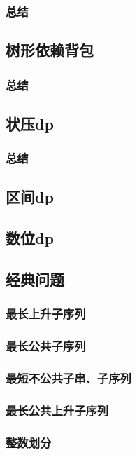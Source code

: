 \documentclass[10pt,a4paper]{article}
\begin{document}
	\subsubsection{总结}
	
	\subsection{树形依赖背包}
	\subsubsection{总结}
	
	\subsection{状压dp}
	\subsubsection{总结}
	
	\subsection{区间dp}
	\subsection{数位dp}
	\subsection{经典问题}
	\subsubsection{最长上升子序列}
	
	\subsubsection{最长公共子序列}
	
	\subsubsection{最短不公共子串、子序列}
	
	\subsubsection{最长公共上升子序列}
	
	\subsubsection{整数划分}
	
\end{document}
